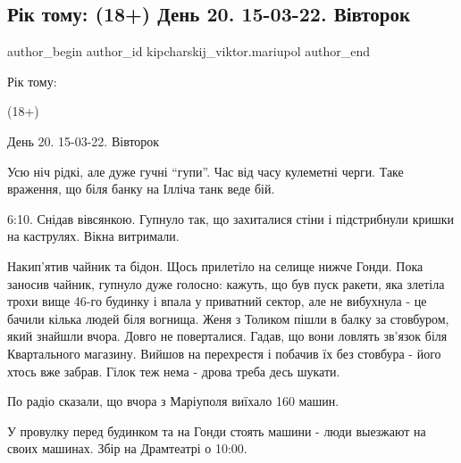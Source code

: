  
 
 
 
 

\subsection{Рік тому: (18+) День 20. 15-03-22. Вівторок}
\label{sec:15_03_2023.fb.kipcharskij_viktor.mariupol.1.r_k_tomu___18__den_}

\ifcmt
 author_begin
   author_id kipcharskij_viktor.mariupol
 author_end
\fi

Рік тому:

(18+)

День 20. 15-03-22. Вівторок

Усю ніч рідкі, але дуже гучні \enquote{гупи}. Час від часу кулеметні черги. Таке
враження, що біля банку на Ілліча танк веде бій.

6:10. Снідав вівсянкою. Гупнуло так, що захиталися стіни і підстрибнули кришки
на каструлях. Вікна витримали.


Накип'ятив чайник та бідон. Щось прилетіло на селище нижче Гонди. Пока заносив
чайник, гупнуло дуже голосно: кажуть, що був пуск ракети, яка злетіла трохи
вище 46-го будинку і впала у приватний сектор, але не вибухнула - це бачили
кілька людей біля вогнища. Женя з Толиком пішли в балку за стовбуром, який
знайшли вчора. Довго не поверталися. Гадав, що вони ловлять зв'язок біля
Квартального магазину. Вийшов на перехрестя і побачив їх без стовбура - його
хтось вже забрав. Гілок теж нема - дрова треба десь шукати.

По радіо сказали, що вчора з Маріуполя виїхало 160 машин.

У провулку перед будинком та на Гонди стоять машини - люди выезжают на своих
машинах. Збір на Драмтеатрі о 10:00.

